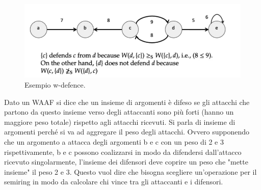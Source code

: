 \begin{figure}[H]
    \centering
    \includegraphics[width=14cm, keepaspectratio]{img/w_difesa.png}
    \caption{Esempio w-defence.}\label{fig:w_difesa}
\end{figure}
Dato un WAAF si dice che un insieme di argomenti è difeso se gli attacchi che partono da questo insieme verso degli attaccanti sono più forti (hanno un maggiore peso totale) rispetto agli attacchi ricevuti. Si parla di insieme di argomenti perché si va ad aggregare il peso degli attacchi. Ovvero supponendo che un argomento a attacca degli argomenti b e c con un peso di 2 e 3 rispettivamente, b e c possono coalizzarsi in modo da difendersi dall'attacco ricevuto singolarmente, l'insieme dei difensori deve coprire un peso che "mette insieme" il peso 2 e 3.   Questo vuol dire che bisogna scegliere un'operazione per il semiring in modo da calcolare chi vince tra gli attaccanti e i difensori. 
